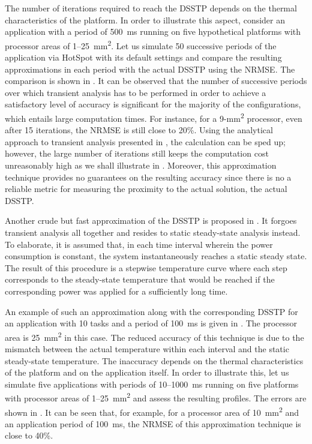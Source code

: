 The number of iterations required to reach the \ac{DSSTP} depends on the thermal
characteristics of the platform. In order to illustrate this aspect, consider an
application with a period of 500~ms running on five hypothetical platforms with
processor areas of 1--25~mm\textsuperscript{2}. Let us simulate 50 successive
periods of the application via HotSpot with its default settings and compare the
resulting approximations in each period with the actual \ac{DSSTP} using the
\ac{NRMSE}. The comparison is shown in . It can
be observed that the number of successive periods over which transient analysis
has to be performed in order to achieve a satisfactory level of accuracy is
significant for the majority of the configurations, which entails large
computation times. For instance, for a 9-mm\textsuperscript{2} processor, even
after 15 iterations, the \ac{NRMSE} is still close to 20\%. Using the analytical
approach to transient analysis presented in , the
calculation can be sped up; however, the large number of iterations still keeps
the computation cost unreasonably high as we shall illustrate in
. Moreover, this approximation technique
provides no guarantees on the resulting accuracy since there is no a reliable
metric for measuring the proximity to the actual solution, the actual
\ac{DSSTP}.

Another crude but fast approximation of the \ac{DSSTP} is proposed in
\cite{huang2009}. It forgoes transient analysis all together and resides to
static steady-state analysis instead. To elaborate, it is assumed that, in each
time interval wherein the power consumption is constant, the system
instantaneously reaches a static steady state. The result of this procedure is a
stepwise temperature curve where each step corresponds to the steady-state
temperature that would be reached if the corresponding power was applied for a
sufficiently long time.

An example of such an approximation along with the corresponding \ac{DSSTP} for
an application with 10 tasks and a period of 100~ms is given in
. The processor area is
25~mm\textsuperscript{2} in this case. The reduced accuracy of this technique is
due to the mismatch between the actual temperature within each interval and the
static steady-state temperature. The inaccuracy depends on the thermal
characteristics of the platform and on the application itself. In order to
illustrate this, let us simulate five applications with periods of 10--1000~ms
running on five platforms with processor areas of 1--25~mm\textsuperscript{2}
and assess the resulting profiles. The errors are shown in
. It can be seen that, for example, for a
processor area of 10~mm\textsuperscript{2} and an application period of 100~ms,
the \ac{NRMSE} of this approximation technique is close to 40\%.

